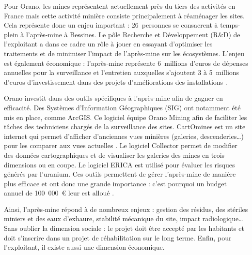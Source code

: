 \documentclass{article}
\begin{document}
Pour Orano, les mines représentent actuellement près du tiers des activités en France mais cette activité minière consiste principalement à réaménager les sites. Cela représente donc un enjeu important : 26~personnes se consacrent à temps-plein à l'après-mine à Bessines. Le pôle Recherche et Développement (R\&D) de l’exploitant a dans ce cadre un rôle à jouer en essayant d’optimiser les traitements et de minimiser l’impact de l’après-mine sur les écosystèmes. L'enjeu est également économique : l’après-mine représente 6~millions d’euros de dépenses annuelles pour la surveillance et l’entretien auxquelles s’ajoutent 3 à 5~millions d’euros d’investissement dans des projets d’améliorations des installations \cite{himeur_apres-mine_2020}.

Orano investit dans des outils spécifiques à l’après-mine afin de gagner en efficacité. Des Systèmes d’Information Géographiques (SIG) ont notamment été mis en place, comme ArcGIS. Ce logiciel équipe Orano Mining afin de faciliter les tâches des techniciens chargés de la surveillance des sites.
CartOmines est un site internet qui permet d’afficher d’anciennes vues minières (galeries, descenderies…) pour les comparer aux vues actuelles \cite{noauthor_cartomines_nodate}. Le logiciel Collector permet de modifier des données cartographiques et de visualiser les galeries des mines en trois dimensions ou en coupe. Le logiciel ERICA est utilisé pour évaluer les risques générés par l’uranium. Ces outils permettent de gérer l’après-mine de manière plus efficace et ont donc une grande importance : c’est pourquoi un budget annuel de 100~000~\euro{} leur est alloué \cite{gerland_outils_2020}.

Ainsi, l’après-mine répond à de nombreux enjeux : gestion des résidus, des stériles miniers et des eaux d’exhaure, stabilité mécanique du site, impact radiologique… Sans oublier la dimension sociale : le projet doit être accepté par les habitants et doit s’inscrire dans un projet de réhabilitation sur le long terme. Enfin, pour l’exploitant, il existe aussi une dimension économique.
\end{document}
